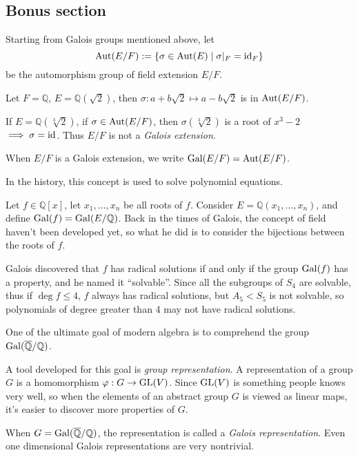 \subsection{Bonus section}
\label{sub:Bonus section}
Starting from Galois groups mentioned above,
let
\[
\operatorname{Aut}(E / F) := \left\{\sigma \in \operatorname{Aut}(E)\mid \sigma|_F = \operatorname{id}_F\right\}
\]
be the automorphism group of field extension $E / F$.
\begin{example}
    Let $F = \mathbb{Q}$, $E = \mathbb{Q}(\sqrt{2})$, then
	$\sigma: a+b\sqrt{2} \mapsto a-b\sqrt{2}$ is in $\operatorname{Aut}(E / F)$.

	If $E = \mathbb{Q}(\sqrt[3]{2})$, if $\sigma\in \operatorname{Aut}(E / F)$, then
	$\sigma(\sqrt[3]{2})$ is a root of $x^3 - 2$ $ \implies \sigma = \operatorname{id}$.
	Thus $E / F$ is not a \textit{Galois extension}.
\end{example}

When $E / F$ is a Galois extension, we write $\operatorname{Gal}(E / F) = \operatorname{Aut}(E / F)$.

In the history, this concept is used to solve polynomial equations.

Let $f\in \mathbb{Q}[x]$, let $x_1,\dots,x_n$ be all roots of $f$.
Consider $E = \mathbb{Q}(x_1,\dots,x_n)$, and define $\operatorname{Gal}(f) = \operatorname{Gal}(E / \mathbb{Q})$.
Back in the times of Galois, the concept of field haven't been developed yet,
so what he did is to consider the bijections between the roots of $f$.

Galois discovered that $f$ has radical solutions if and only if
the group $\operatorname{Gal}(f)$ has a property, and he named it ``solvable''.
Since all the subgroups of $S_4$ are solvable, thus if $\deg f\le 4$,
$f$ always has radical solutions, but $A_5<S_5$ is not solvable,
so polynomials of degree greater than 4 may not have radical solutions.

One of the ultimate goal of modern algebra is to comprehend the
group $\operatorname{Gal}(\overline{\mathbb{Q}}/\mathbb{Q})$.

A tool developed for this goal is \textit{group representation}.
A representation of a group $G$ is a homomorphism $\varphi: G\to \mathrm{GL}(V)$.
Since $\mathrm{GL}(V)$ is something people knows very well, so when
the elements of an abstract group $G$ is viewed as linear maps,
it's easier to discover more properties of $G$.

When $G = \operatorname{Gal}(\overline{\mathbb{Q}}/\mathbb{Q})$, the representation is
called a \textit{Galois representation}. Even one dimensional
Galois representations are very nontrivial.
